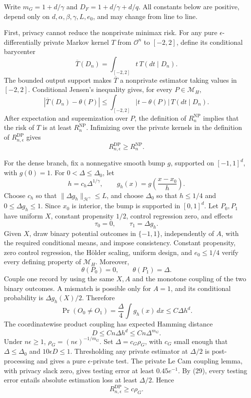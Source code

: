 Write \(m_G=1+d/\gamma\) and \(D_F=1+d/\gamma+d/q\).  All constants below are positive, depend only on \(d,\alpha,\beta,\gamma,L,e_0\), and may change from line to line.

First, privacy cannot reduce the nonprivate minimax risk.  For any pure \(\epsilon\)-differentially private Markov kernel \(T\) from \(\mathcal O^n\) to \([-2,2]\), define its conditional barycenter
\[
 \overline T(D_n)=\int_{[-2,2]}t\,T(dt\mid D_n).
\]
The bounded output support makes \(\overline T\) a nonprivate estimator taking values in \([-2,2]\).  Conditional Jensen's inequality gives, for every \(P\in\mathcal M_H\),
\[
 |\overline T(D_n)-\theta(P)|
 \le\int_{[-2,2]}|t-\theta(P)|\,T(dt\mid D_n).
\]
After expectation and supremization over \(P\), the definition of \(R_n^{\mathrm{NP}}\) implies that the risk of \(T\) is at least \(R_n^{\mathrm{NP}}\).  Infimizing over the private kernels in the definition of \(R_{n,\epsilon}^{\mathrm{DP}}\) gives
\[
 R_{n,\epsilon}^{\mathrm{DP}}\ge R_n^{\mathrm{NP}}.
 \tag{28}
\]

For the dense branch, fix a nonnegative smooth bump \(g\), supported on \([-1,1]^d\), with \(g(0)=1\).  For \(0<\Delta\le\Delta_0\), let
\[
 h=c_h\Delta^{1/\gamma},\qquad
 g_h(x)=g\!\left(\frac{x-x_0}{h}\right).
\]
Choose \(c_h\) so that \(\|\Delta g_h\|_{\mathcal H^\gamma}\le L\), and choose \(\Delta_0\) so that \(h\le1/4\) and \(0\le\Delta g_h\le1\).  Since \(x_0\) is interior, the bump is supported in \([0,1]^d\).  Let \(P_0,P_1\) have uniform \(X\), constant propensity \(1/2\), control regression zero, and effects
\[
 \tau_0=0,\qquad \tau_1=\Delta g_h.
\]
Given \(X\), draw binary potential outcomes in \(\{-1,1\}\), independently of \(A\), with the required conditional means, and impose consistency.  Constant propensity, zero control regression, the H\"older scaling, uniform design, and \(e_0\le1/4\) verify every defining property of \(\mathcal M_H\).  Moreover,
\[
 \theta(P_0)=0,\qquad \theta(P_1)=\Delta.
 \tag{29}
\]
Couple one record by using the same \(X,A\) and the monotone coupling of the two binary outcomes.  A mismatch is possible only for \(A=1\), and its conditional probability is \(\Delta g_h(X)/2\).  Therefore
\[
 \Pr(O_0\ne O_1)
 =\frac{\Delta}{4}\int g_h(x)\,dx
 \le C\Delta h^d.
\]
The coordinatewise product coupling has expected Hamming distance
\[
 D\le Cn\Delta h^d\le Cn\Delta^{m_G}.
 \tag{30}
\]
Under \(n\epsilon\ge1\), \(\rho_G=(n\epsilon)^{-1/m_G}\).  Set \(\Delta=c_G\rho_G\), with \(c_G\) small enough that \(\Delta\le\Delta_0\) and \(10\epsilon D\le1\).  Thresholding any private estimator at \(\Delta/2\) is post-processing and gives a pure \(\epsilon\)-private test.  The private Le Cam coupling lemma, with privacy slack zero, gives testing error at least \(0.45e^{-1}\).  By (29), every testing error entails absolute estimation loss at least \(\Delta/2\).  Hence
\[
 R_{n,\epsilon}^{\mathrm{DP}}\ge c\rho_G.
 \tag{31}
\]

